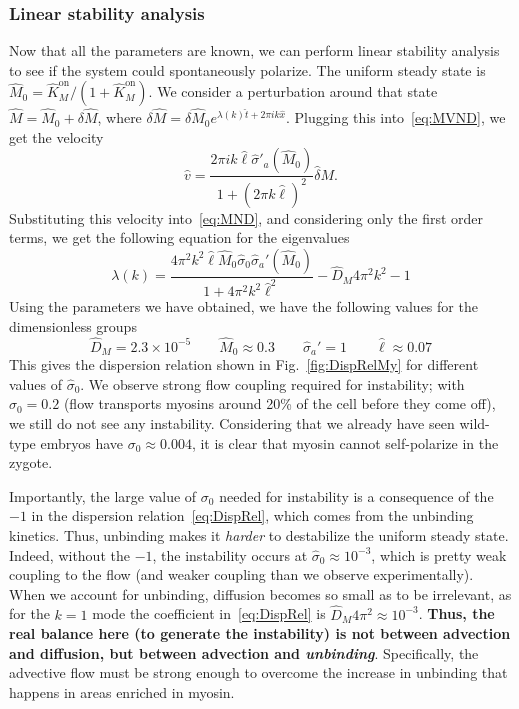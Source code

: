 \documentclass[11pt]{article}
\newcommand{\6}[1]{#1_{\text{6}}}
\newcommand{\3}[1]{#1_{\text{3}}}
\begin{document}
\subsubsection{Linear stability analysis \label{sec:StabMy}}
Now that all the parameters are known, we can perform linear stability analysis to see if the system could spontaneously polarize. The uniform steady state is $\hat{M}_0= \hat{K}^\text{on}_M/\left(1+\hat{K}^\text{on}_M\right)$. We consider a perturbation around that state $\hat M=\hat{M}_0+\delta \hat M$, where $\delta \hat M = \delta \hat M_0 e^{\lambda(k) \hat{t}+2 \pi i k \hat{x}}$. Plugging this into\ \eqref{eq:MVND}, we get the velocity \cite[Eq.~(11)]{bois2011pattern}
\begin{equation}
\hat v = \frac{2 \pi i k \hat{\ell} \hat{\sigma}'_a(\hat M_0)}{1 + \left(2 \pi k \hat \ell\right)^2} \hat \delta M. 
\end{equation}
Substituting this velocity into\ \eqref{eq:MND}, and considering only the first order terms, we get the following equation for the eigenvalues
\begin{equation}
\label{eq:DispRel}
\lambda(k) = \frac{4\pi^2 k^2 \hat{\ell} \hat{M}_0 \hat{\sigma}_0 \hat \sigma_a'(\hat{M}_0)}{1+4\pi^2 k^2 \hat{\ell}^2} - \hat{D}_M 4 \pi^2 k^2 -1
\end{equation}
Using the parameters we have obtained, we have the following values for the dimensionless groups
\begin{equation}
\hat{D}_M = 2.3 \times 10^{-5} \qquad \hat{M}_0 \approx 0.3 \qquad \hat \sigma_a'=1 \qquad \hat{\ell} \approx 0.07
\end{equation}
This gives the dispersion relation shown in Fig.\ \ref{fig:DispRelMy} for different values of $\hat{\sigma}_0$. We observe strong flow coupling required for instability; with $\hat{\sigma}_0=0.2$ (flow transports myosins around 20\% of the cell before they come off), we still do not see any instability. Considering that we already have seen wild-type embryos have $\sigma_0 \approx 0.004$, it is clear that myosin cannot self-polarize in the zygote.

Importantly, the large value of $\sigma_0$ needed for instability is a consequence of the $-1$ in the dispersion relation\ \eqref{eq:DispRel}, which comes from the unbinding kinetics. Thus, unbinding makes it \emph{harder} to destabilize the uniform steady state. Indeed, without the $-1$, the instability occurs at $\hat{\sigma}_0 \approx 10^{-3}$, which is pretty weak coupling to the flow (and weaker coupling than we observe experimentally). When we account for unbinding, diffusion becomes so small as to be irrelevant, as for the $k=1$ mode the coefficient in\ \eqref{eq:DispRel} is $\hat{D}_M 4 \pi^2 \approx 10^{-3}$. \textbf{Thus, the real balance here (to generate the instability) is not between advection and diffusion, but between advection and \emph{unbinding}}. Specifically, the advective flow must be strong enough to overcome the increase in unbinding that happens in areas enriched in myosin. 
\end{document}
